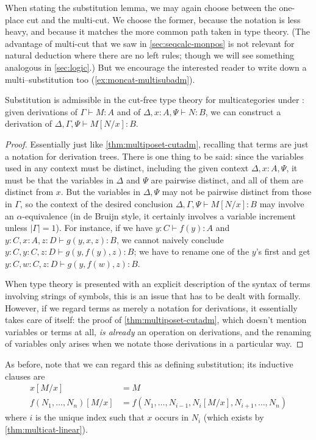 \documentclass{book}
\let\types\vdash
\begin{document}
When stating the substitution lemma, we may again choose between the one-place cut and the multi-cut.
We choose the former, because the notation is less heavy, and because it matches the more common path taken in type theory.
(The advantage of multi-cut that we saw in \cref{sec:seqcalc-monpos} is not relevant for natural deduction where there are no left rules; though we will see something analogous in \cref{sec:logic}.)
But we encourage the interested reader to write down a multi--substitution too (\cref{ex:moncat-multisubadm}).

\begin{thm}\label{thm:multicat-subadm}
  Substitution is admissible in the cut-free type theory for multicategories under \cG: given derivations of $\Gamma\types M:A$ and of $\Delta,x:A,\Psi\types N:B$, we can construct a derivation of $\Delta,\Gamma,\Psi\types M[N/x]:B$.
\end{thm}
\begin{proof}
  Essentially just like \cref{thm:multiposet-cutadm}, recalling that terms are just a notation for derivation trees.
  There is one thing to be said: since the variables used in any context must be distinct, including the given context $\Delta,x:A,\Psi$, it must be that the variables in $\Delta$ and $\Psi$ are pairwise distinct, and all of them are distinct from $x$.
  But the variables in $\Delta,\Psi$ may not be pairwise distinct from those in $\Gamma$, so the context of the desired conclusion $\Delta,\Gamma,\Psi\types M[N/x]:B$ may involve an $\alpha$-equivalence (in de Bruijn style, it certainly involves a variable increment unless $|\Gamma|=1$).
  For instance, if we have $y:C\types f(y):A$ and $y:C,x:A,z:D\types g(y,x,z):B$, we cannot naively conclude $y:C,y:C,z:D\types g(y,f(y),z):B$; we have to rename one of the $y$'s first and get $y:C,w:C,z:D\types g(y,f(w),z):B$.

  When type theory is presented with an explicit description of the syntax of terms involving strings of symbols, this is an issue that has to be dealt with formally.
  However, if we regard terms as merely a notation for derivations, it essentially takes care of itself: the proof of \cref{thm:multiposet-cutadm}, which doesn't mention variables or terms at all, \emph{is already} an operation on derivations, and the renaming of variables only arises when we notate those derivations in a particular way.
\end{proof}

As before, note that we can regard this as defining substitution; its inductive clauses are
\begin{align*}
  x[M/x] &= M\\
  f(N_1,\dots,N_n)[M/x] &= f(N_1,\dots,N_{i-1},N_i[M/x],N_{i+1},\dots,N_n)
\end{align*}
where $i$ is the unique index such that $x$ occurs in $N_i$ (which exists by \cref{thm:multicat-linear}).
\end{document}
